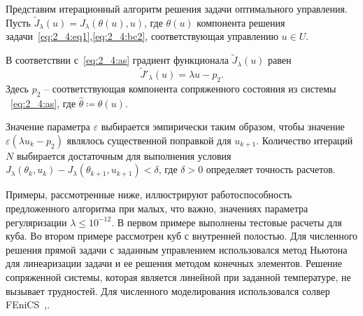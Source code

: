 Представим итерационный алгоритм решения задачи оптимального управления.
Пусть $\tilde J_\lambda(u)=J_\lambda(\theta(u), u)$,
где $\theta(u)$ компонента решения
задачи~\eqref{eq:2_4:eq1},\eqref{eq:2_4:bc2},
соответствующая управлению $u\in U$.

В соответствии с~\eqref{eq:2_4:as} градиент функционала $\tilde J_\lambda(u)$ равен
\[ \tilde J'_\lambda (u) = \lambda u - p_2. \]
Здесь $p_2$ -- соответствующая компонента сопряженного состояния из системы ~\eqref{eq:2_4:as},
где $\hat{\theta}\coloneqq\theta(u)$.

Значение параметра $\varepsilon$ выбирается эмпирически таким образом, чтобы значение
$\varepsilon (\lambda u_k - p_2)$ являлось существенной поправкой для $u_{k+1}$.
Количество итераций $N$ выбирается достаточным для выполнения условия
$J_\lambda(\theta_k, u_k) - J_\lambda(\theta_{k+1}, u_{k+1}) < \delta$, где $\delta > 0$
определяет точность расчетов.

Примеры, рассмотренные ниже, иллюстрируют работоспособность предложенного алгоритма при
малых, что важно, значениях параметра регуляризации $\lambda \leq 10^{-12}$.
В первом примере выполнены тестовые расчеты для куба.
Во втором примере рассмотрен куб с внутренней полостью.
Для численного решения прямой задачи с заданным управлением использовался
метод Ньютона для линеаризации задачи и ее решения методом конечных элементов.
Решение сопряженной системы, которая является линейной
при заданной температуре, не вызывает трудностей.
Для численного моделирования использовался солвер FEniCS~\cite{fenics},\cite{dolfin}.

